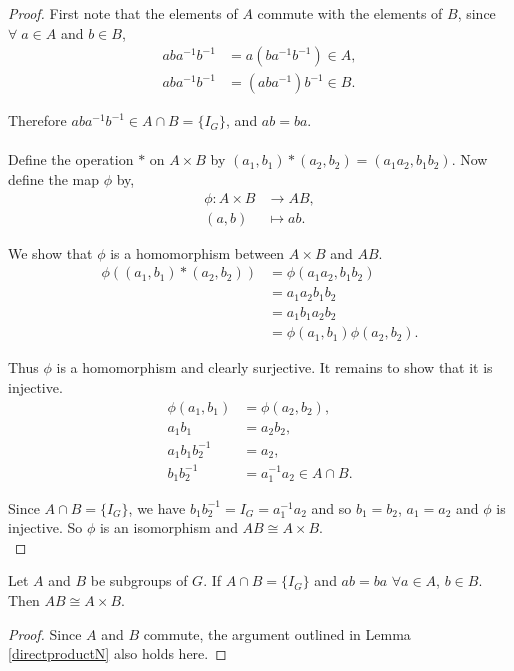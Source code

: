 \begin{proof}

First note that the elements of $A$ commute with the elements of $B$, since $\forall \; a \in A$ and $b \in B$,
\begin{align*} aba^{-1}b^{-1} &=  a(ba^{-1}b^{-1}) \in A, \tag{since $A \vartriangleleft G$}
\\ aba^{-1}b^{-1} &=  (aba^{-1})b^{-1} \in B. \tag{since $B \vartriangleleft G$}
\end{align*}

Therefore $aba^{-1}b^{-1} \in A \cap B = \{ I_G \}$, and $ab = ba$. \\
\\
Define the operation $*$ on $A \times B$ by $(a_1 , b_1)*(a_2 , b_2) = (a_1 a_2 , b_1 b_2)$. Now define the map $\phi$ by,
\begin{align*}
\phi:A \times B &\longrightarrow AB, \\
(a,b) &\longmapsto ab \tag{$\forall \; a \in A, \; b\in B$}. \end{align*}

We show that $\phi$ is a homomorphism between $A \times B$ and $AB$.
\vspace{-0.5mm}
\begin{align*}
\phi((a_1,  b_1)*(a_2, b_2)) &= \phi (a_1 a_2 , b_1 b_2) \\
&=  a_1 a_2  b_1 b_2 \\
&=  a_1 b_1 a_2 b_2  \\
&= \phi(a_1 , b_1) \phi(a_2 , b_2). \end{align*}

Thus $\phi$ is a homomorphism and clearly surjective. It remains to show that it is injective. 
\vspace{-0.5mm}
\begin{align*} \phi(a_1 , b_1) &= \phi(a_2 , b_2), \\
a_1 b_1 &= a_2 b_2, \\
a_1 b_1 b_2^{-1} &= a_2, \\
b_1 b_2^{-1} &= a_1^{-1} a_2 \in A \cap B.
\end{align*}

Since $A \cap B = \{ I_G \}$, we have $b_1 b_2^{-1} = I_G = a_1^{-1} a_2$ and so $b_1 = b_2$, $a_1 = a_2$ and $\phi$ is injective. So $\phi$ is an isomorphism and $AB \cong A \times B$.
\\
\end{proof}

\begin{lemma}\label{directproductZ} Let $A$ and $B$ be subgroups of $G$. If $A \cap B = \{ I_G \}$ and $ab = ba$ $\forall a \in A$, $b \in B$. Then $AB \cong A \times B$.
\end{lemma}

\begin{proof} Since $A$ and $B$ commute, the argument outlined in Lemma \ref{directproductN} also holds here.
\end{proof}



